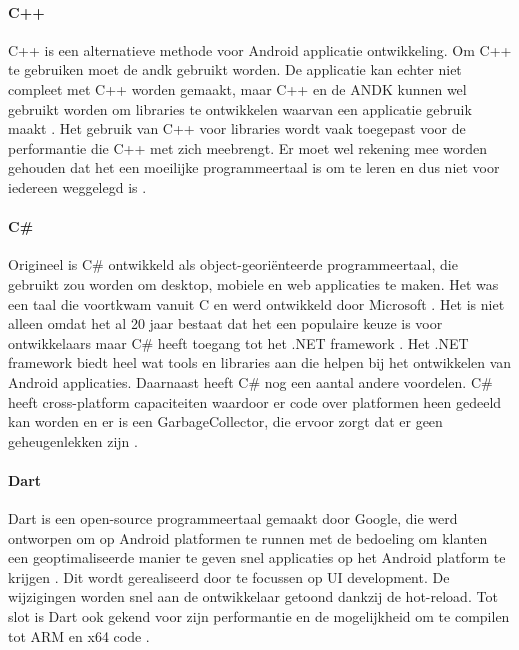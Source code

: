 \paragraph{C++}
C++ is een alternatieve methode voor Android applicatie ontwikkeling. Om C++ te gebruiken 
moet de \acrshort{andk} gebruikt worden. De applicatie kan echter niet compleet 
met C++ worden gemaakt, maar C++ en de ANDK kunnen wel gebruikt worden om libraries te ontwikkelen 
waarvan een applicatie gebruik maakt \autocite{harkiran2022}. Het gebruik van C++ voor libraries wordt 
vaak toegepast voor de performantie die C++ met zich meebrengt. Er moet wel rekening mee worden 
gehouden dat het een moeilijke programmeertaal is om te leren en dus niet voor iedereen weggelegd is 
\autocite{Designveloper2022}.

\paragraph{C\#}\label{pa:csharp}
Origineel is C\# ontwikkeld als object-georiënteerde programmeertaal, die gebruikt zou 
worden om desktop, mobiele en web applicaties te maken. Het was een taal die voortkwam 
vanuit C en werd ontwikkeld door Microsoft \autocite{Designveloper2022}. Het is niet alleen 
omdat het al 20 jaar bestaat dat het een populaire keuze is voor ontwikkelaars 
maar C\# heeft toegang tot het .NET framework \autocite{Kesavan2021}. Het .NET framework 
biedt heel wat tools en libraries aan die helpen bij het ontwikkelen van Android applicaties. 
Daarnaast heeft C\# nog een aantal andere voordelen. C\# heeft cross-platform 
capaciteiten waardoor er code over platformen heen gedeeld kan worden en er is een 
\gls{GarbageCollector}, die ervoor zorgt dat er geen geheugenlekken zijn \autocite{Patel2023}.

\paragraph{Dart}
Dart is een open-source programmeertaal gemaakt door Google, die werd ontworpen om op 
Android platformen te runnen \autocite{Kesavan2021} met de bedoeling om klanten een 
geoptimaliseerde manier te geven snel applicaties op het Android platform te krijgen 
\autocite{harkiran2022}. Dit wordt gerealiseerd door te focussen op UI development. De wijzigingen 
worden snel aan de ontwikkelaar getoond dankzij de hot-reload. Tot slot is Dart ook gekend 
voor zijn performantie en de mogelijkheid om te compilen tot ARM en x64 code \autocite{harkiran2022}.

